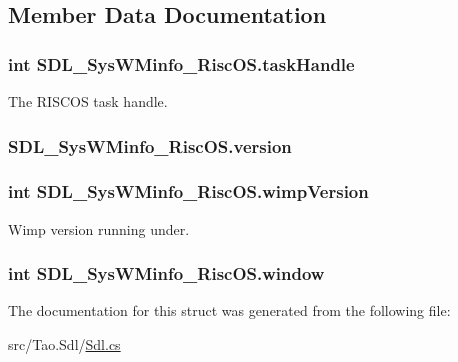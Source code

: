 \subsection{Member Data Documentation}
\hypertarget{struct_s_d_l___sys_w_minfo___risc_o_s_a6cf640475e04efbf4f1162a3bb03b54c}{
\subsubsection[{taskHandle}]{\setlength{\rightskip}{0pt plus 5cm}int {\bf SDL\_\-SysWMinfo\_\-RiscOS.taskHandle}}}
\label{struct_s_d_l___sys_w_minfo___risc_o_s_a6cf640475e04efbf4f1162a3bb03b54c}


The RISCOS task handle. 

\hypertarget{struct_s_d_l___sys_w_minfo___risc_o_s_a76bfd4454ea03cb2bc72a7d31bdaab5b}{
\subsubsection[{version}]{ {\bf SDL\_\-SysWMinfo\_\-RiscOS.version}}}
\label{struct_s_d_l___sys_w_minfo___risc_o_s_a76bfd4454ea03cb2bc72a7d31bdaab5b}
\hypertarget{struct_s_d_l___sys_w_minfo___risc_o_s_af9968cd4c4535dbec1bb2bb6b8cf2380}{
\subsubsection[{wimpVersion}]{\setlength{\rightskip}{0pt plus 5cm}int {\bf SDL\_\-SysWMinfo\_\-RiscOS.wimpVersion}}}
\label{struct_s_d_l___sys_w_minfo___risc_o_s_af9968cd4c4535dbec1bb2bb6b8cf2380}


Wimp version running under. 

\hypertarget{struct_s_d_l___sys_w_minfo___risc_o_s_a7052e68f3653245d003ffb23b2d59517}{
\subsubsection[{window}]{\setlength{\rightskip}{0pt plus 5cm}int {\bf SDL\_\-SysWMinfo\_\-RiscOS.window}}}
\label{struct_s_d_l___sys_w_minfo___risc_o_s_a7052e68f3653245d003ffb23b2d59517}


The documentation for this struct was generated from the following file:\begin{DoxyCompactItemize}
\item 
src/Tao.Sdl/\hyperlink{_sdl_8cs}{Sdl.cs}\end{DoxyCompactItemize}
